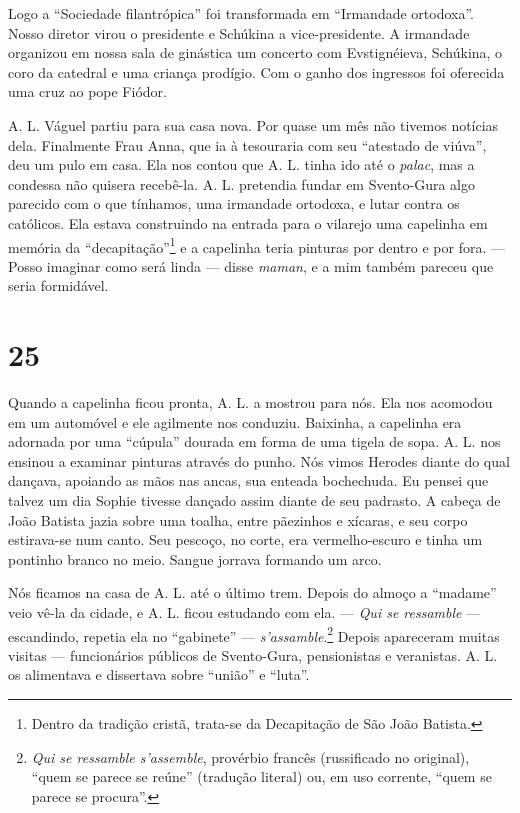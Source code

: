 Logo a ``Sociedade filantrópica'' foi transformada em ``Irmandade
ortodoxa''. Nosso diretor virou o presidente e Schúkina a
vice-presidente. A irmandade organizou em nossa sala de ginástica um
concerto com Evstignéieva, Schúkina, o coro da catedral e uma criança
prodígio. Com o ganho dos ingressos foi oferecida uma cruz ao pope
Fiódor.

A. L. Váguel partiu para sua casa nova. Por quase um mês não tivemos
notícias dela. Finalmente Frau Anna, que ia à tesouraria com seu
``atestado de viúva'', deu um pulo em casa. Ela nos contou que A. L.
tinha ido até o \emph{palac}, mas a condessa não quisera recebê-la. A.
L. pretendia fundar em Svento-Gura algo parecido com o que tínhamos, uma
irmandade ortodoxa, e lutar contra os católicos. Ela estava construindo
na entrada para o vilarejo uma capelinha em memória da
``decapitação''\footnote{Dentro da tradição cristã, trata-se da
  Decapitação de São João Batista.} e a capelinha teria pinturas por
dentro e por fora. --- Posso imaginar como será linda --- disse
\emph{maman}, e a mim também pareceu que seria formidável.

\section{25}

Quando a capelinha ficou pronta, A. L. a mostrou para nós. Ela nos
acomodou em um automóvel e ele agilmente nos conduziu. Baixinha, a
capelinha era adornada por uma ``cúpula'' dourada em forma de uma tigela
de sopa. A. L. nos ensinou a examinar pinturas através do punho. Nós
vimos Herodes diante do qual dançava, apoiando as mãos nas ancas, sua
enteada bochechuda. Eu pensei que talvez um dia Sophie tivesse dançado
assim diante de seu padrasto. A cabeça de João Batista jazia sobre uma
toalha, entre pãezinhos e xícaras, e seu corpo estirava-se num canto.
Seu pescoço, no corte, era vermelho-escuro e tinha um pontinho branco no
meio. Sangue jorrava formando um arco.

Nós ficamos na casa de A. L. até o último trem. Depois do almoço a
``madame'' veio vê-la da cidade, e A. L. ficou estudando com ela. ---
\emph{Qui se ressamble} --- escandindo, repetia ela no ``gabinete'' ---
\emph{s'assamble}.\footnote{\emph{Qui se ressamble s'assemble},
  provérbio francês (russificado no original), ``quem se parece se
  reúne'' (tradução literal) ou, em uso corrente, ``quem se parece se
  procura''.} Depois apareceram muitas visitas --- funcionários públicos
de Svento-Gura, pensionistas e veranistas. A. L. os alimentava e
dissertava sobre ``união'' e ``luta''.

